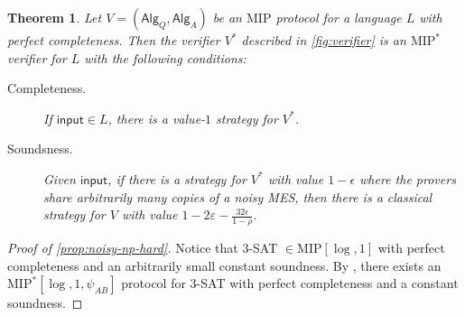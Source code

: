 \documentclass[10pt,a4paper]{article}
\theoremstyle{plain}
\newtheorem{theorem}{Theorem}[section]
\theoremstyle{definition}
\newcommand{\ep} {\ensuremath{\varepsilon}}
\newcommand{\1}{\mathbb{1}} %
\newcommand{\ipt}{\mathsf{input}}
\newcommand{\Alg}{\mathsf{Alg}}
\newcommand{\MIP}{\mathrm{MIP}}
\begin{document}
\begin{theorem}\label{prop:NPC}
    Let $V= (\Alg_Q, \Alg_A)$ be an $\MIP$ protocol for a language $L$ with perfect completeness.
    Then the verifier $V^*$ described in \cref{fig:verifier} is an $\MIP^*$ verifier for $L$
    with the following conditions:
    \begin{description}
        \item[Completeness.] If $\ipt \in L$, there is a value-$1$ strategy for $V^*$.
        \item[Soundsness.] Given $\ipt$, if there is a strategy for $V^*$ with value $1-\epsilon$ where the provers share
        arbitrarily many copies of a noisy MES, then there is
        a classical strategy for $V$ with value $1 - 2\ep - \frac{32\epsilon}{1-\rho}$.
    \end{description}
\end{theorem}
\begin{proof}[Proof of \cref{prop:noisy-np-hard}]
Notice that $3$-SAT $\in \MIP[\log, 1]$ \cite{Babai1991} with perfect completeness and an arbitrarily small constant soundness. By , there exists an $\MIP^*[\log,1,\psi_{AB}]$ protocol for $3$-SAT with perfect completeness and a constant soundness. 
\end{proof}
\end{document}

